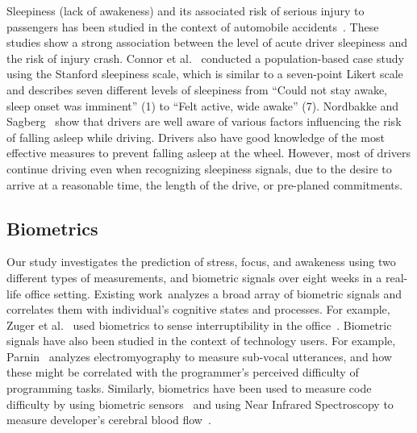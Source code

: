 Sleepiness (lack of awakeness) and its associated risk of serious injury to passengers has been studied in the context of automobile 
accidents~\cite{connor02,Nordbakke07}.
These studies show a strong association between the level of acute driver sleepiness and the risk of injury crash.
Connor et al.~\cite{connor02} conducted a population-based case study using the Stanford sleepiness scale, which is similar to a seven-point Likert scale and describes seven different levels of sleepiness from ``Could not stay awake, sleep onset was imminent'' (1) to ``Felt active, wide awake'' (7).
Nordbakke and Sagberg~\cite{Nordbakke07} show that drivers are well aware of  various factors influencing the risk of falling asleep while driving. Drivers also have good knowledge of the most effective measures to prevent falling asleep at the wheel.
However, most of drivers continue driving even when recognizing sleepiness signals, due to the desire to arrive at a reasonable time, the length of the drive, or pre-planed commitments.


\subsection{Biometrics}
Our study investigates the prediction of stress, focus, and awakeness using two different types of measurements, and biometric signals over eight weeks in a real-life office setting.
Existing work~\cite{sano2013stress,healey2005detecting,wijsman2011towards,zuger2015interruptibility,goyal2017intelligent,Parnin2011,Nakagawa2014,Radevski2015}analyzes a broad array of biometric signals and correlates them with individual's cognitive states and processes.
For example, Zuger et al.~\cite{zuger18} used biometrics to sense interruptibility in the office~\cite{zuger18}.
Biometric signals have also been studied in the context of technology users. For example, Parnin~\cite{Parnin2011} analyzes electromyography to measure sub-vocal utterances, and how these might be correlated with the programmer's perceived difficulty of programming tasks. Similarly, biometrics have been used to measure code difficulty by using biometric sensors~\cite{fritz2014using}
and using Near Infrared Spectroscopy to measure developer's cerebral blood flow~\cite{Nakagawa2014}.

